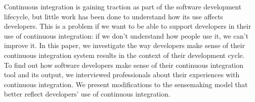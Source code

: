 \documentclass{sig-alternate}
\begin{document}
%
\author{
%
%
\alignauthor
Nicholas Nelson\\
       \\
       \\
\alignauthor
Charles Hill\\
       \\
       \\
}

\newcommand{\michael}{P1}
\newcommand{\sruti}{P2}
\newcommand{\caius}{P3}
\newcommand{\srutitwo}{P4}
\newcommand{\david}{P5}
\newcommand{\cpg}{P6}

\maketitle
\begin{abstract}
\end{abstract}
Continuous integration is gaining traction as part of the software development lifecycle, but little work has been done to understand how its use affects developers.
This is a problem if we want to be able to support developers in their use of continuous integration: if we don't understand how people use it, we can't improve it.
 In this paper, we investigate the way developers make sense of their continuous integration system results in the context of their development cycle. To find out how software developers make sense of their continuous integration tool and its output, we interviewed professionals about their experiences with continuous integration.
We present modifications to the sensemaking model that better reflect developers' use of continuous integration.
\smallskip
\end{document}
